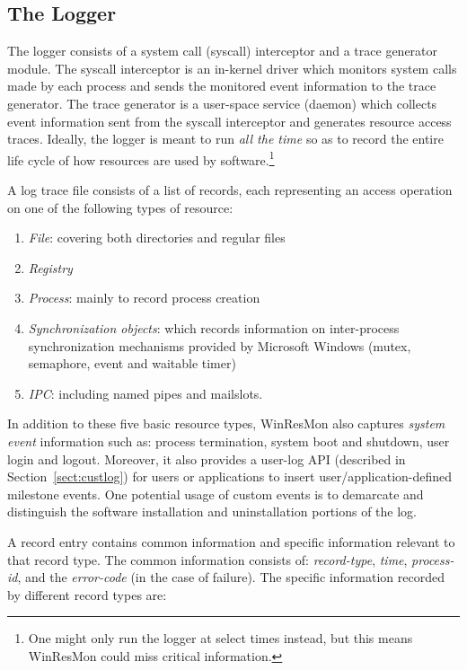 \subsection{The Logger}

The logger consists of a system call (syscall) interceptor and a trace
generator module.  The syscall interceptor is an in-kernel driver which
monitors system calls made by each process and sends the monitored event
information to the trace generator.  The trace generator is a user-space
service (daemon) which collects event information sent from the syscall
interceptor and generates resource access traces.  Ideally, the logger is
meant to run {\em all the time} so as to record the entire life cycle of how
resources are used by software.\footnote{ One might only run the
logger at select times instead, but this means WinResMon could miss critical information. }

A log trace file consists of a list of records, each representing 
an access operation on one of the following types of resource:

\begin{enumerate}
\item {\em File}: covering both directories and regular files
\item {\em Registry}
\item {\em Process}: mainly to record process creation
\item {\em Synchronization objects}: which records information on
inter-process synchronization mechanisms provided by Microsoft Windows (mutex,
semaphore, event and waitable timer)
\item {\em IPC}: including named pipes and mailslots.
\end{enumerate}

In addition to these five basic resource types, WinResMon also captures {\it
system event} information such as: process termination, system boot and
shutdown, user login and logout.  
Moreover, it also provides a user-log API
(described in Section~\ref{sect:custlog}) for users or applications to insert
user/application-defined milestone events.  One potential usage of custom
events is to demarcate and distinguish the software installation and
uninstallation portions of the log.

A record entry contains common information and specific information
relevant to that record type.
The common information consists of: {\em record-type}, 
{\em time}, {\em process-id}, and the {\em error-code} 
(in the case of failure).  
The specific information recorded by different record types are:

